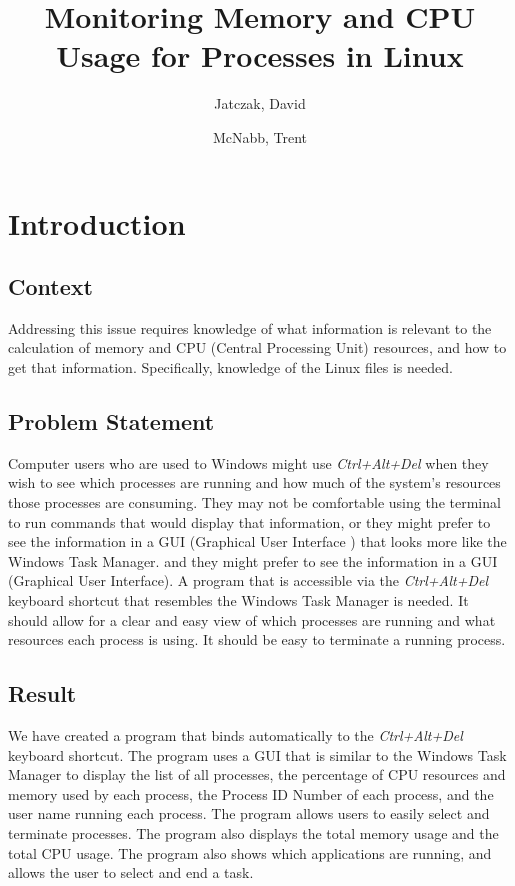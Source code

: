 \documentclass[12pt]{article}
\title{Monitoring Memory and CPU Usage for Processes in Linux}
\author{Jatczak, David \and McNabb, Trent}
\begin{document}
	
	\maketitle
	
	\section{Introduction}
	
	\subsection{Context}
	Addressing this issue requires knowledge of what information is relevant to the calculation of memory and CPU (Central Processing Unit) resources, and how to get that information. Specifically, knowledge of the Linux  files is needed.
	
	\subsection{Problem Statement}
	Computer users who are used to Windows might use \emph{Ctrl+Alt+Del} when they wish to see which processes are running and how much of the system's resources those processes are consuming. They may not be comfortable using the terminal to run commands that would display that information, or they might prefer to see the information in a GUI (Graphical User Interface ) that looks more like the Windows Task Manager. and they might prefer to see the information in a GUI (Graphical User Interface). A program that is accessible via the \emph{Ctrl+Alt+Del} keyboard shortcut that resembles the Windows Task Manager is needed. It should allow for a clear and easy view of which processes are running and what resources each process is using. It should be easy to terminate a running process.
	
	\subsection{Result}
We have created a program that binds automatically to the \emph{Ctrl+Alt+Del} keyboard shortcut. The program uses a GUI that is similar to the Windows Task Manager to display the list of all processes, the percentage of CPU resources and memory used by each process, the Process ID Number of each process, and the user name running each process. The program allows users to easily select and terminate processes. The program also displays the total memory usage and the total CPU usage. The program also shows which applications are running, and allows the user to select and end a task.
	
\end{document}
